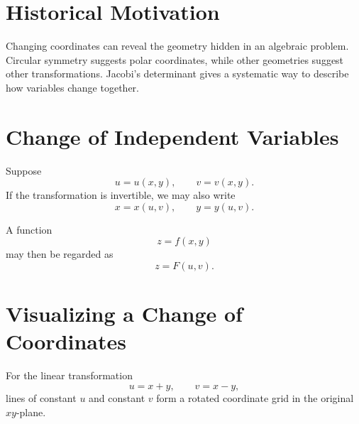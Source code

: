 \documentclass[11pt,oneside]{book}
\theoremstyle{studentthm}
\theoremstyle{definition}
\begin{document}
\section*{Historical Motivation}

Changing coordinates can reveal the geometry hidden in an algebraic
problem. Circular symmetry suggests polar coordinates, while other
geometries suggest other transformations. Jacobi's determinant gives a
systematic way to describe how variables change together.

\section{Change of Independent Variables}

Suppose
\[
u=u(x,y),
\qquad
v=v(x,y).
\]
If the transformation is invertible, we may also write
\[
x=x(u,v),
\qquad
y=y(u,v).
\]

A function
\[
z=f(x,y)
\]
may then be regarded as
\[
z=F(u,v).
\]


\section{Visualizing a Change of Coordinates}

For the linear transformation
\[
u=x+y,\qquad v=x-y,
\]
lines of constant \(u\) and constant \(v\) form a rotated coordinate
grid in the original \(xy\)-plane.

\begin{center}
\end{center}
\end{document}

